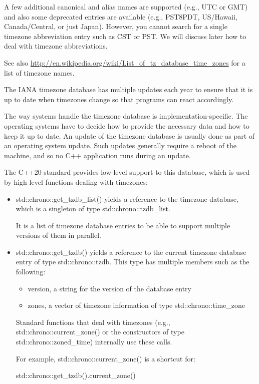 A few additional canonical and alias names are supported (e.g., UTC or GMT) and also some deprecated entries are available (e.g., PST8PDT, US/Hawaii, Canada/Central, or just Japan). However, you cannot search for a single timezone abbreviation entry such as CST or PST. We will discuss later how to deal with timezone abbreviations.

See also \url{http://en.wikipedia.org/wiki/List_of_tz_database_time_zones} for a list of timezone names.


The IANA timezone database has multiple updates each year to ensure that it is up to date when timezones change so that programs can react accordingly.

The way systems handle the timezone database is implementation-specific. The operating systems have to decide how to provide the necessary data and how to keep it up to date. An update of the timezone database is usually done as part of an operating system update. Such updates generally require a reboot of the machine, and so no C++ application runs during an update.

The C++20 standard provides low-level support to this database, which is used by high-level functions dealing with timezones:

\begin{itemize}
\item 
std::chrono::get\_tzdb\_list() yields a reference to the timezone database, which is a singleton of type std::chrono::tzdb\_list.

It is a list of timezone database entries to be able to support multiple versions of them in parallel.

\item 
std::chrono::get\_tzdb() yields a reference to the current timezone database entry of type std::chrono::tzdb. This type has multiple members such as the following:

\begin{itemize}
\item 
version, a string for the version of the database entry

\item 
zones, a vector of timezone information of type std::chrono::time\_zone
\end{itemize}

Standard functions that deal with timezones (e.g., std::chrono::current\_zone() or the constructors of type std::chrono::zoned\_time) internally use these calls.

For example, std::chrono::current\_zone() is a shortcut for:

\begin{cpp}
std::chrono::get_tzdb().current_zone()
\end{cpp}
\end{itemize}

